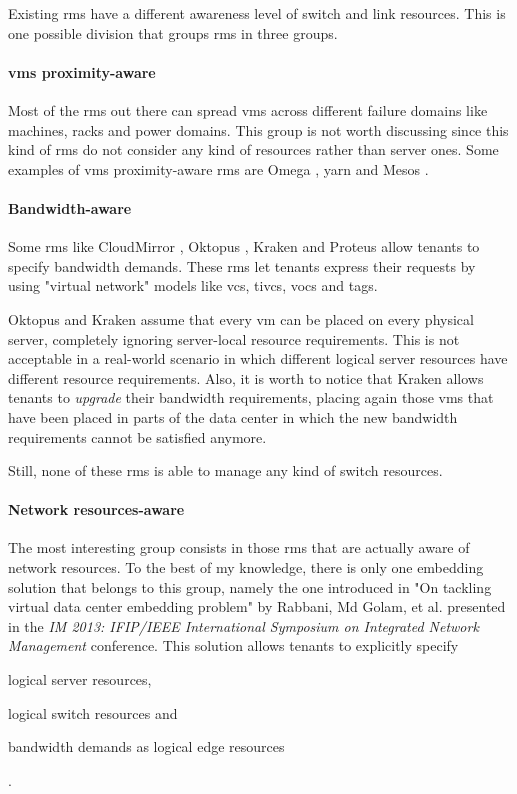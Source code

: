 Existing \glspl{rm} have a different awareness level of switch and link resources.
This is one possible division that groups \glspl{rm} in three groups.

\paragraph{\glspl{vm} proximity-aware}
Most of the \glspl{rm} out there can spread \glspl{vm} across different failure domains like machines, racks and power domains.
This group is not worth discussing since this kind of \glspl{rm} do not consider any kind of resources rather than server ones.
Some examples of \glspl{vm} proximity-aware \glspl{rm} are Omega \cite{omega}, \glsdesc{yarn} and Mesos \cite{mesos}.

\paragraph{Bandwidth-aware}
   
Some \glspl{rm} like CloudMirror \cite{cloudmirror}, Oktopus \cite{oktopus}, Kraken \cite{kraken} and Proteus \cite{proteus} allow tenants to specify bandwidth demands.
These \glspl{rm} let tenants express their requests by using "virtual network" models like \glspl{vc}, \glspl{tivc}, \glspl{voc} and \glspl{tag}.

Oktopus \cite{oktopus} and Kraken \cite{kraken} assume that every \gls{vm} can be placed on every physical server, completely ignoring server-local resource requirements.
This is not acceptable in a real-world scenario in which different logical server resources have different resource requirements.
Also, it is worth to notice that Kraken \cite{kraken} allows tenants to \textit{upgrade} their bandwidth requirements, placing again those \glspl{vm} that have been placed in parts of the data center in which the new bandwidth requirements cannot be satisfied anymore.

Still, none of these \glspl{rm} is able to manage any kind of switch resources.

\paragraph{Network resources-aware}
The most interesting group consists in those \glspl{rm} that are actually aware of network resources.
To the best of my knowledge, there is only one embedding solution that belongs to this group, namely the one introduced in "On tackling virtual data center embedding problem" \cite{ontackling} by Rabbani, Md Golam, et al. presented in the \textit{IM 2013: IFIP/IEEE International Symposium on Integrated Network Management} conference.
This solution allows tenants to explicitly specify
\begin{mylist}
    \item logical server resources,
    \item logical switch resources and
    \item bandwidth demands as logical edge resources
\end{mylist}.

